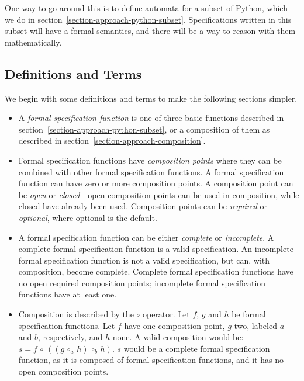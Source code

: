 \documentclass[a4paper,11pt]{kth-mag}
\begin{document}
One way to go around this is to define automata for a subset of Python, which
we do in section~\ref{section-approach-python-subset}. Specifications written
in this subset will have a formal semantics, and there will be a way to reason
with them mathematically.


\subsection{Definitions and Terms}

We begin with some definitions and terms to make the following sections
simpler.

\begin{itemize}
  \item A \textit{formal specification function} is one of three basic
    functions described in section~\ref{section-approach-python-subset}, or a
    composition of them as described in
    section~\ref{section-approach-composition}.

  \item Formal specification functions have \textit{composition points} where
    they can be combined with other formal specification functions. A formal
    specification function can have zero or more composition points. A
    composition point can be \textit{open} or \textit{closed} - open
    composition points can be used in composition, while closed have already
    been used. Composition points can be \textit{required} or
    \textit{optional}, where optional is the default.

  \item A formal specification function can be either \textit{complete} or
    \textit{incomplete}. A complete formal specification function is a valid
    specification. An incomplete formal specification function is not a valid
    specification, but can, with composition, become complete. Complete formal
    specification functions have no open required composition points;
    incomplete formal specification functions have at least one.

  \item Composition is described by the $\circ$ operator. Let $f$, $g$ and $h$
    be formal specification functions. Let $f$ have one composition point, $g$
    two, labeled $a$ and $b$, respectively, and $h$ none. A valid composition
    would be: $s = f \, \circ \, ((g \, \circ_{a} \, h) \, \circ_{b} \, h)$.
    $s$ would be a complete formal specification function, as it is composed of
    formal specification functions, and it has no open composition points.


\end{itemize}
\end{document}
